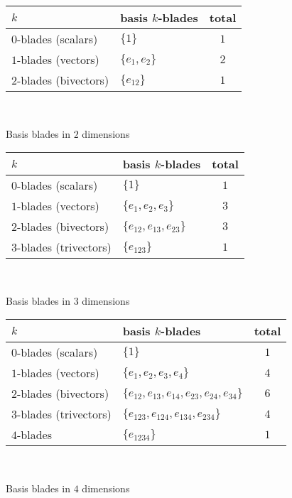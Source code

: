 \documentclass[10pt]{report}
\begin{document}
\begin{figure}[ht]
\begin{center}
\begin{tabular}{|l|l|c|}
  \hline
  $k$ & basis $k$-blades & total \\
  \hline
  $0$-blades (scalars) & $\{1\}$ & $1$ \\
  $1$-blades (vectors) & $\{e_{1}, e_{2}\}$ & $2$ \\
  $2$-blades (bivectors) & $\{e_{12}\}$ & $1$ \\
  \hline
\end{tabular}\\
\end{center}
\label{tab:Basis blades in $2$ dimensions}
\caption{Basis blades in $2$ dimensions}
\end{figure}
\begin{figure}[ht]
\begin{center}
\begin{tabular}{|l|l|c|}
  \hline
  $k$ & basis $k$-blades & total \\
  \hline
  $0$-blades (scalars) & $\{1\}$ & $1$ \\
  $1$-blades (vectors) & $\{e_{1}, e_{2}, e_{3}\}$ & $3$ \\
  $2$-blades (bivectors) & $\{e_{12}, e_{13}, e_{23}\}$ & $3$ \\
  $3$-blades (trivectors) & $\{e_{123}\}$ & $1$ \\
  \hline
\end{tabular}\\
\end{center}
\label{tab:Basis blades in $3$ dimensions}
\caption{Basis blades in $3$ dimensions}
\end{figure}
\begin{figure}[ht]
\begin{center}
\begin{tabular}{|l|l|c|}
  \hline
  $k$ & basis $k$-blades & total \\
  \hline
  $0$-blades (scalars) & $\{1\}$ & $1$ \\
  $1$-blades (vectors) & $\{e_{1}, e_{2}, e_{3}, e_{4}\}$ & $4$ \\
  $2$-blades (bivectors) & $\{e_{12}, e_{13}, e_{14}, e_{23}, e_{24}, e_{34}\}$ & $6$ \\
  $3$-blades (trivectors) & $\{e_{123}, e_{124}, e_{134}, e_{234}\}$ & $4$ \\
  $4$-blades & $\{e_{1234}\}$ & $1$ \\
  \hline
\end{tabular}\\
\end{center}
\label{tab:Basis blades in $4$ dimensions}
\caption{Basis blades in $4$ dimensions}
\end{figure}
\end{document}
